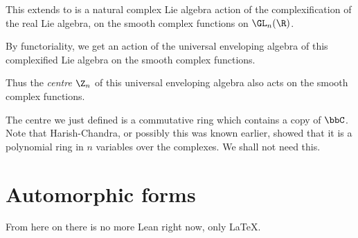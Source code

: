 \begin{definition}
  \label{instComplexLieAlgebraAction}

  This extends to is a natural complex Lie algebra action of the complexification of
  the real Lie algebra, on the smooth complex functions on $\GL_n(\R)$.

\end{definition}

\begin{definition}
  \label{instUniversalEnvelopingAlgebraAction}
By functoriality, we get an action of the universal enveloping algebra of this
complexified Lie algebra on the smooth complex functions.

\end{definition}

\begin{definition}
\label{instCentreAction}
Thus the \emph{centre} $\Z_n$ of this universal enveloping algebra also acts on the smooth
complex functions.

\end{definition}

\begin{remark} The centre we just defined is a commutative ring which contains a copy of $\bbC$.
  Note that Harish-Chandra, or possibly this was known earlier, showed that it is a polynomial
  ring in $n$ variables over the complexes. We shall not need this.
\end{remark}

\section{Automorphic forms}

From here on there is no more Lean right now, only LaTeX.

